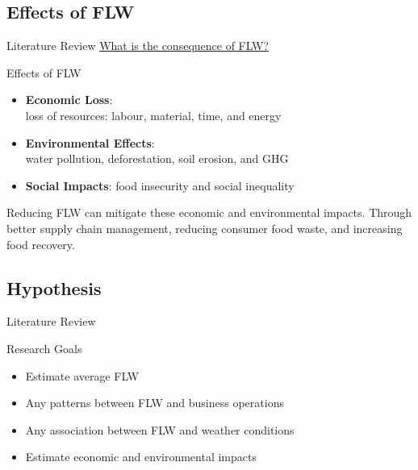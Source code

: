 \documentclass{beamer}
\begin{document}
\subsection{Effects of FLW}
\begin{frame}{Literature Review}
    \underline{What is the consequence of FLW?}
    \begin{block}{Effects of FLW}
        \begin{itemize}
            \item \textbf{Economic Loss}:\\
             loss of resources: labour, material, time, and energy
            \item \textbf{Environmental Effects}:\\
            water pollution, deforestation, soil erosion, and GHG
            \item \textbf{Social Impacts}: food insecurity and social inequality\\    
        \end{itemize}
    \end{block}

Reducing FLW can mitigate these economic and environmental impacts.
Through better supply chain management, reducing consumer food waste,
and increasing food recovery.

\end{frame}

\subsection{Hypothesis}
\begin{frame}{Literature Review}
    \begin{block}{Research Goals}
        \begin{itemize}
            \item Estimate average FLW
            \item Any patterns between FLW and business operations
            \item Any association between FLW and weather conditions
            \item Estimate economic and environmental impacts
        \end{itemize}
    \end{block}
\end{frame}

\end{document}
